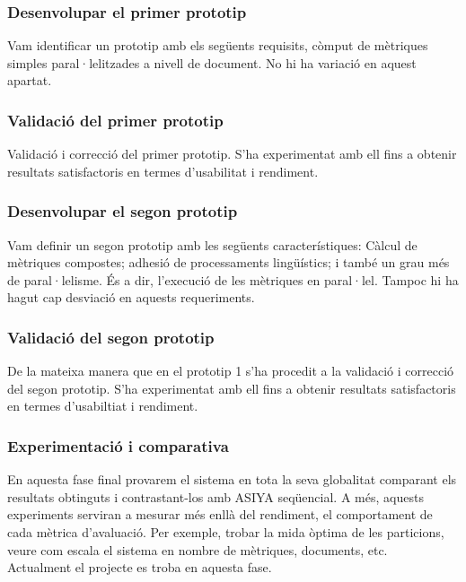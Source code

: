 \documentclass[11pt,a4paper]{article}
\begin{document}
\subsubsection{Desenvolupar el primer prototip}
Vam identificar un prototip amb els següents requisits, còmput de mètriques simples paral·lelitzades a nivell de document. No hi ha variació en aquest apartat.

\subsubsection{Validació del primer prototip}
Validació i correcció del primer prototip. S’ha experimentat amb  ell fins a obtenir resultats satisfactoris en termes d’usabilitat i rendiment.

\subsubsection{Desenvolupar el segon prototip}
Vam definir un segon prototip amb les següents característiques: Càlcul de mètriques compostes; adhesió de processaments lingüístics; i també un grau més de paral·lelisme. És a dir, l’execució de les mètriques en paral·lel. Tampoc hi ha hagut cap desviació en aquests requeriments.

\subsubsection{Validació del segon prototip}
De la mateixa manera que en el prototip 1 s’ha procedit a la validació i correcció del segon prototip. S’ha experimentat amb  ell fins a obtenir resultats satisfactoris en termes d’usabiltiat i  rendiment.

\subsubsection{Experimentació i comparativa}
En aquesta fase final provarem el sistema en tota la seva globalitat comparant els resultats obtinguts i contrastant-los amb ASIYA seqüencial. A més, aquests experiments serviran a mesurar més enllà del rendiment, el comportament de cada mètrica d'avaluació. Per exemple, trobar la mida òptima de les particions, veure com escala el sistema en nombre de mètriques, documents, etc.
\\

Actualment el projecte es troba en aquesta fase.

\newpage
\end{document}
